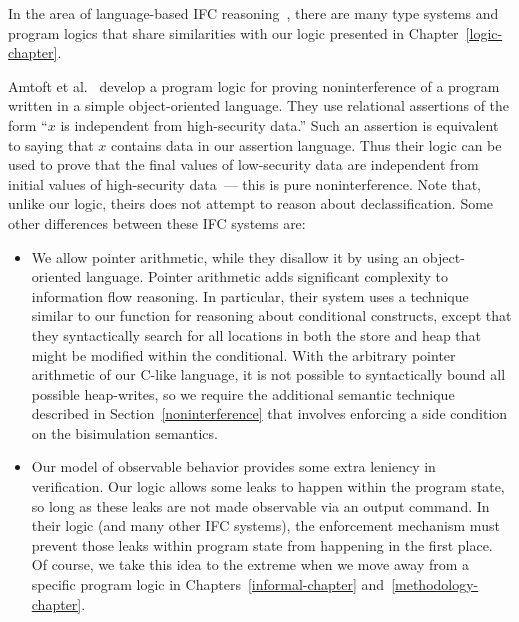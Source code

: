 In the area of language-based IFC reasoning~\cite{sabelfeld03}, there are many type systems 
and program logics that share similarities with our logic presented in Chapter~\ref{logic-chapter}.

Amtoft et al.~\cite{amtoft06} develop a program logic for proving noninterference of 
a program written in a simple object-oriented language. They use relational assertions
of the form ``$x$ is independent from high-security data.'' Such an assertion is equivalent
to saying that $x$ contains \lo{} data in our assertion language. Thus their logic can be used to prove
that the final values of low-security data are independent from initial values of high-security
data~--- this is pure noninterference. Note that, unlike our logic, theirs does not attempt 
to reason about declassification. 
Some other differences between these IFC systems are:
\begin{itemize}
\item We allow pointer arithmetic, while they disallow it by using an object-oriented language.
Pointer arithmetic adds significant complexity to information flow reasoning. In particular,
their system uses a technique similar to our  function for reasoning about
conditional constructs, except that they syntactically search for all locations in both the store 
and heap that might be modified within the conditional. With the arbitrary pointer arithmetic
of our C-like language, it is not possible to syntactically bound all possible heap-writes, 
so we require the additional semantic technique described in Section~\ref{noninterference}
that involves enforcing a side condition on the bisimulation semantics.
\item Our model of observable behavior provides some extra leniency in verification. Our logic
allows some leaks to happen within the program state, so long as these leaks are not made 
observable via an output command. In their logic (and many other IFC systems), the enforcement
mechanism must prevent those leaks within program state from happening in the first place.
Of course, we take this idea to the extreme when we move away from a specific program
logic in Chapters~\ref{informal-chapter} and~\ref{methodology-chapter}.
\end{itemize}

